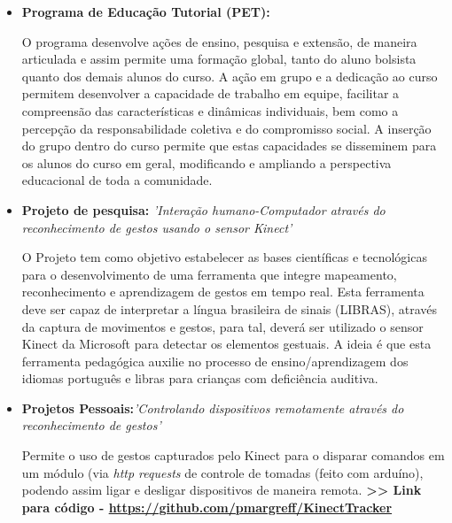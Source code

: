 \documentclass[11pt,a4paper,sans]{moderncv}        %
\begin{document}
\begin{itemize}

\item{\textbf{Programa de Educação Tutorial (PET):} \textit{}

\vspace{3pt}

\small{O programa desenvolve ações de ensino, pesquisa e extensão, de maneira articulada e assim
permite uma formação global, tanto do aluno bolsista quanto dos demais alunos do curso.
A ação em grupo e a dedicação ao curso permitem desenvolver a capacidade de trabalho
em equipe, facilitar a compreensão das características e dinâmicas individuais, bem como a
percepção da responsabilidade coletiva e do compromisso social. A inserção do grupo dentro
do curso permite que estas capacidades se disseminem para os alunos do curso em geral,
modificando e ampliando a perspectiva educacional de toda a comunidade.
}}

\newpage

\item{\textbf{Projeto de pesquisa: } \textit{'Interação humano-Computador através do reconhecimento de gestos usando o sensor Kinect'}

\vspace{3pt}

\small{O Projeto tem como objetivo estabelecer as bases científicas e tecnológicas para o desenvolvimento de uma ferramenta que integre mapeamento, reconhecimento e aprendizagem de gestos em tempo real. Esta ferramenta deve ser capaz de interpretar a língua brasileira de sinais (LIBRAS), através da captura de movimentos e gestos, para tal, deverá ser utilizado o sensor Kinect da Microsoft para detectar os elementos gestuais. A ideia é que esta ferramenta pedagógica auxilie no processo de ensino/aprendizagem dos idiomas português e libras para crianças com deficiência auditiva.}}

\vspace{6pt}

\item{\textbf{Projetos Pessoais:}\textit{'Controlando dispositivos remotamente através do reconhecimento de gestos'}

\vspace{3pt}

\small{Permite o uso de gestos  capturados pelo Kinect para o disparar comandos em um módulo (via \textit{http requests} de controle de tomadas (feito com arduíno), podendo assim ligar e desligar dispositivos de maneira remota.
\textbf{ >> Link para código - \href{https://github.com/pmargreff/KinectTracker}{https://github.com/pmargreff/KinectTracker} }}
}
\end{itemize}
\end{document}
